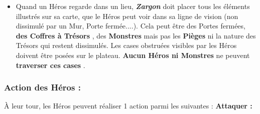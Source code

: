 \documentclass{scrartcl}%
\begin{document}
\begin{itemize}%
\item%
%
 Quand un Héros regarde dans un lieu, %
\textcolor{mygreen}{\textbf{\textit{Zargon}}}%
\textit{ }%
 doit placer tous les éléments illustrés sur sa carte, que le Héros peut voir dans sa ligne de vision (non dissimulé par un Mur, Porte fermée....). Cela peut être des Portes fermées, %
\textcolor{mygreen}{%
\textbf{des Coffres à Trésors}%
}%
, des %
\textcolor{mygreen}{%
\textbf{Monstres}%
}%
mais pas les%
\textcolor{mygreen}{%
\textbf{ Pièges}%
}%
\textit{ }%
 ni la nature des Trésors qui restent dissimulés. Les cases obstruées visibles par les Héros doivent être posées sur le plateau. %
\textcolor{mygreen}{%
\textbf{Aucun Héros ni Monstres}%
}%
\textit{ }%
 ne peuvent %
\textcolor{mygreen}{%
\textbf{traverser ces cases}%
}%
.
%
\end{itemize}

%
\subsubsection{ Action des Héros :
}%
\label{ssubsec:ActiondesHros}%
À leur tour, les Héros peuvent réaliser 1 action parmi les suivantes :
%
\textcolor{mygreen}{%
\textbf{Attaquer :}%
}%
\end{document}
